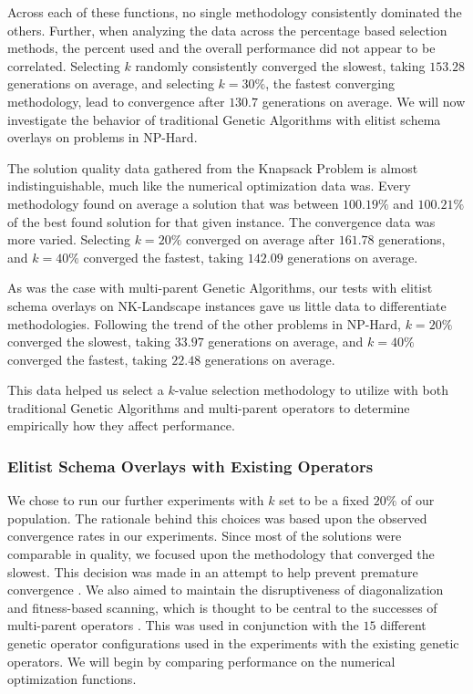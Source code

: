 %
%

Across each of these functions, no single methodology consistently dominated the others. Further, when analyzing the data across the percentage based selection methods, the percent used and the overall performance did not appear to be correlated. Selecting $k$ randomly consistently converged the slowest, taking $153.28$ generations on average, and selecting $k = 30\%$, the fastest converging methodology, lead to convergence after $130.7$ generations on average. We will now investigate the behavior of traditional Genetic Algorithms with elitist schema overlays on problems in NP-Hard.

%
%

The solution quality data gathered from the Knapsack Problem is almost indistinguishable, much like the numerical optimization data was. Every methodology found on average a solution that was between $100.19\%$ and $100.21\%$ of the best found solution for that given instance. The convergence data was more varied. Selecting $k = 20\%$ converged on average after $161.78$ generations, and $k = 40\%$ converged the fastest, taking $142.09$ generations on average. 

%
%

%
%

As was the case with multi-parent Genetic Algorithms, our tests with elitist schema overlays on NK-Landscape instances gave us little data to differentiate methodologies. Following the trend of the other problems in NP-Hard, $k = 20\%$ converged the slowest, taking $33.97$ generations on average, and $k = 40\%$ converged the fastest, taking $22.48$ generations on average.

This data helped us select a $k$-value selection methodology to utilize with both traditional Genetic Algorithms and multi-parent operators to determine empirically how they affect performance.

\subsubsection*{Elitist Schema Overlays with Existing Operators}
We chose to run our further experiments with $k$ set to be a fixed $20\%$ of our population. The rationale behind this choices was based upon the observed convergence rates in our experiments. Since most of the solutions were comparable in quality, we focused upon the methodology that converged the slowest. This decision was made in an attempt to help prevent premature convergence \cite{Andre01}. We also aimed to maintain the disruptiveness of diagonalization and fitness-based scanning, which is thought to be central to the successes of multi-parent operators \cite{Eiben95}. This was used in conjunction with the $15$ different genetic operator configurations used in the experiments with the existing genetic operators. We will begin by comparing performance on the numerical optimization functions.

